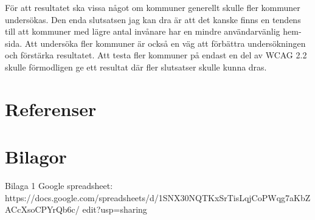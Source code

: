 \documentclass[11p]{article}
\begin{document}
\begin{otherlanguage}{swedish}
    För att resultatet ska vissa något om kommuner generellt skulle fler kommuner undersökas.
    Den enda slutsatsen jag kan dra är att det kanske finns en tendens till att kommuner med lägre antal invånare har en mindre användarvänlig hemsida.
    Att undersöka fler kommuner är också en väg att förbättra undersökningen och förstärka resultatet.
    Att testa fler kommuner på endast en del av WCAG 2.2 skulle förmodligen ge ett resultat där fler slutsatser skulle kunna dras.

    \newpage
    \section{Referenser}

    \printbibliography[heading=none]

    \section{Bilagor}
    Bilaga 1
    Google spreadsheet:
    \\ https://docs.google.com/spreadsheets/d/1SNX30NQTKxSrTisLqjCoPWqg7aKbZACcXsoCPYrQb6c/
    edit?usp=sharing

    \end{otherlanguage}
\end{document}
